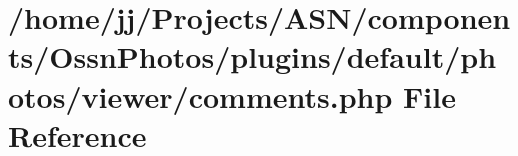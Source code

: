 \hypertarget{_ossn_photos_2plugins_2default_2photos_2viewer_2comments_8php}{}\section{/home/jj/\+Projects/\+A\+S\+N/components/\+Ossn\+Photos/plugins/default/photos/viewer/comments.php File Reference}
\label{_ossn_photos_2plugins_2default_2photos_2viewer_2comments_8php}

